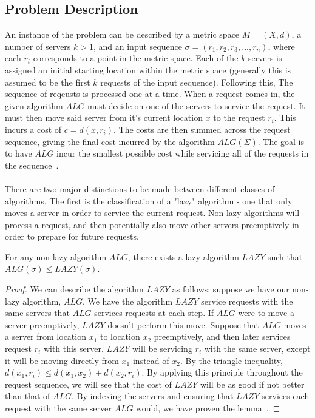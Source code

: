 \subsection{Problem Description}
\label{sec:desc}
An instance of the \KS problem can be described by a metric space $M = (X, d)$, a number of servers $k>1$, and an input sequence $\sigma = (r_1, r_2, r_3, ..., r_n)$, where each $r_i$ corresponds to a point in the metric space. Each of the $k$ servers is assigned an initial starting location within the metric space (generally this is assumed to be the first $k$ requests of the input sequence). Following this, The sequence of reqeusts is processed one at a time. When a request comes in, the given algorithm $ALG$ must decide on one of the servers to service the request. It must then move said server from it's current location $x$ to the request $r_i$. This incurs a cost of $c = d(x, r_i)$. The costs are then summed across the request sequence, giving the final cost incurred by the algorithm $ALG(\Sigma)$. The goal is to have $ALG$ incur the smallest possible cost while servicing all of the requests in the sequence~\cite{OnlineComp1998}.
\\ \\
There are two major distinctions to be made between different classes of algorithms. The first is the classification of a "lazy" algorithm - one that only moves a server in order to service the current request. Non-lazy algorithms will process a request, and then potentially also move other servers preemptively in order to prepare for future requests. 

\begin{lemma}
    For any non-lazy algorithm $ALG$, there exists a lazy algorithm $LAZY$ such that $ALG(\sigma) \leq LAZY(\sigma)$.
\end{lemma}

\begin{proof}
    We can describe the algorithm $LAZY$ as follows: suppose we have our non-lazy algorithm, $ALG$. We have the algorithm $LAZY$ service requests with the same servers that $ALG$ services requests at each step. If $ALG$ were to move a server preemptively, $LAZY$ doesn't perform this move. Suppose that $ALG$ moves a server from location $x_1$ to location $x_2$ preemptively, and then later services request $r_i$ with this server. $LAZY$ will be servicing $r_i$ with the same server, except it will be moving directly from $x_1$ instead of $x_2$. By the triangle inequality, $d(x_1, r_i) \leq d(x_1, x_2) + d(x_2, r_i)$. By applying this principle throughout the request sequence, we will see that the cost of $LAZY$ will be as good if not better than that of $ALG$. By indexing the servers and ensuring that $LAZY$ services each request with the same server $ALG$ would, we have proven the lemma~\cite{OnlineComp1998}.
\end{proof}

